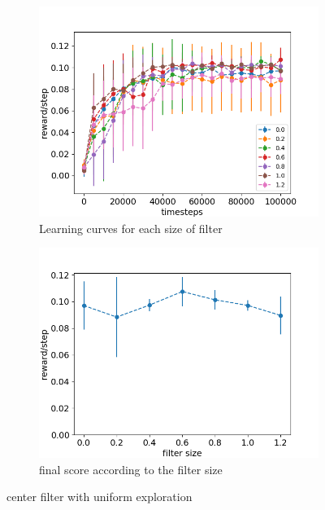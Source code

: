 \documentclass{article}
\begin{document}
\begin{figure}[H]
  \centering
   \begin{subfigure}[b]{0.4\linewidth}
    \includegraphics[width=\linewidth]{Study_2/2.1/visualizations/scores_filter_size.png}
      \caption{Learning curves for each size of filter}
  \end{subfigure}
  \begin{subfigure}[b]{0.4\linewidth}
    \includegraphics[width=\linewidth]{Study_2/2.1/visualizations/total_scores.png}
    \caption{final score according to the filter size}
  \end{subfigure}
   \caption{center filter with uniform exploration}
   \label{fig:center_curves_uniform}
\end{figure}
\end{document}
